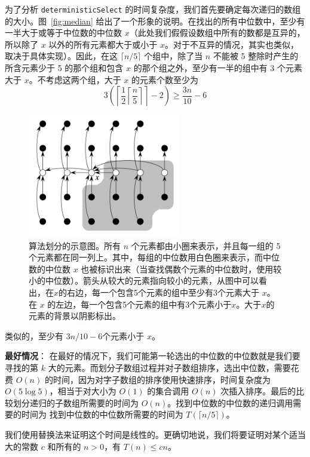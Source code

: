 为了分析 \texttt{deterministicSelect} 的时间复杂度，我们首先要确定每次递归的数组的大小。图~\autoref{fig:median} 给出了一个形象的说明。在找出的所有中位数中，至少有一半大于或等于中位数的中位数 $x$（此处我们假假设数组中所有的数都是互异的，所以除了 $x$ 以外的所有元素都大于或小于 $x$。对于不互异的情况，其实也类似，取决于具体实现）。因此，在这 $\lceil n/5 \rceil$ 个组中，除了当 $n$ 不能被 5 整除时产生的所含元素少于 5 的那个组和包含 $x$ 的那个组之外，至少有一半的组中有 3 个元素大于 $x$。不考虑这两个组，大于 $x$ 的元素个数至少为\[3\left(\left\lceil\frac12\left\lceil\frac n5\right\rceil\right\rceil-2\right)\geqslant\frac{3n}{10}-6\]
\begin{figure}[htbp]
    \centering
    \includegraphics[width=0.6\textwidth]{../figure/analysis.png}
    \caption{算法划分的示意图。所有 $n$ 个元素都由小圈来表示，并且每一组的 5 个元素都在同一列上。其中，每组的中位数用白色圈来表示，而中位数的中位数 $x$ 也被标识出来（当查找偶数个元素的中位数时，使用较小的中位数）。箭头从较大的元素指向较小的元素，从图中可以看出，在$x$的右边，每一个包含5个元素的组中至少有3个元素大于 $x$。在 $x$ 的左边，每一个包含5个元素的组中有3个元素小于$x$。大于$x$的元素的背景以阴影标出。}
    \label{fig:median}
\end{figure}

类似的，至少有 $3n/10-6$个元素小于 $x$。

\textbf{最好情况}：
在最好的情况下，我们可能第一轮选出的中位数的中位数就是我们要寻找的第 $k$ 大的元素。而划分子数组过程并对子数组排序，选出中位数，需要花费 $O(n)$ 的时间，因为对字子数组的排序使用快速排序，时间复杂度为 $O(5\log 5)$，相当于对大小为 $O(1)$ 的集合调用 $O(n)$ 次插入排序。最后的比较划分递归的子数组所需要的时间为 $O(n)$。找到中位数的中位数的递归调用需要的时间为 找到中位数的中位数所需要的时间为 $T(\lceil n/5 \rceil)$。

我们使用替换法来证明这个时间是线性的。更确切地说，我们将要证明对某个适当大的常数 $c$ 和所有的 $n > 0$，有 $T(n) \leq cn$。

